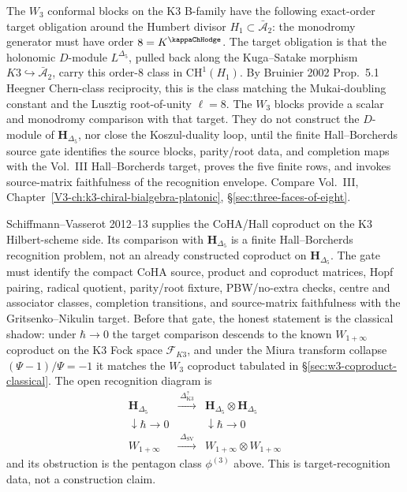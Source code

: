 \begin{remark}
\label{rem:w-algebras-w3-2}
The $W_3$ conformal blocks on the K3 B-family have the following
exact-order target obligation around the Humbert divisor
$H_1\subset\bar{\mathcal A}_2$: the monodromy generator must have
order $8 = K^{\kappaChHodge}$. The target obligation is that the
holonomic $D$-module $L^{\Delta_5}$, pulled back along the
Kuga--Satake morphism $K3\hookrightarrow\bar{\mathcal A}_2$, carry this
order-$8$ class in $\mathrm{CH}^1(H_1)$. By Bruinier 2002 Prop.~5.1
Heegner Chern-class reciprocity, this is the class matching the
Mukai-doubling constant and the Lusztig root-of-unity $\ell = 8$.
The $W_3$ blocks provide a scalar and monodromy comparison with that
target. They do not construct the $D$-module of
$\mathbf H_{\Delta_5}$, nor close the Koszul-duality loop, until the
finite Hall--Borcherds source gate identifies the source blocks,
parity/root data, and completion maps with the Vol.~III
Hall--Borcherds target, proves the five finite rows, and invokes
source-matrix faithfulness of the recognition envelope. Compare
Vol.~III,
Chapter~\ref{V3-ch:k3-chiral-bialgebra-platonic},
\S\ref{sec:three-faces-of-eight}.
\end{remark}

\begin{remark}
\label{rem:w-algebras-w3-3}
Schiffmann--Vasserot 2012--13 supplies the CoHA/Hall coproduct on the
K3 Hilbert-scheme side. Its comparison with
$\mathbf H_{\Delta_5}$ is a finite Hall--Borcherds recognition problem,
not an already constructed coproduct on $\mathbf H_{\Delta_5}$. The gate
must identify the compact CoHA source, product and coproduct matrices,
Hopf pairing, radical quotient, parity/root fixture, PBW/no-extra checks,
centre and associator classes, completion transitions, and source-matrix
faithfulness with the Gritsenko--Nikulin target. Before that gate, the
honest statement is the classical shadow: under
$\hbar\to 0$ the target comparison descends to the known
$W_{1+\infty}$ coproduct on the K3 Fock space $\mathcal F_{K3}$, and
under the Miura transform collapse $(\Psi-1)/\Psi = -1$ it matches the
$W_3$ coproduct tabulated in \S\ref{sec:w3-coproduct-classical}. The
open recognition diagram is
\[
\begin{array}{ccc}
\mathbf H_{\Delta_5} & \xrightarrow{\;\Delta_{\mathrm{K3}}^{?}\;} & \mathbf H_{\Delta_5}\otimes\mathbf H_{\Delta_5} \\
\downarrow{\scriptstyle\hbar\to 0} & & \downarrow{\scriptstyle\hbar\to 0} \\
W_{1+\infty} & \xrightarrow{\;\Delta_{\mathrm{SV}}\;} & W_{1+\infty}\otimes W_{1+\infty}
\end{array}
\]
and its obstruction is the pentagon class $\phi^{(3)}$ above. This is
target-recognition data, not a construction claim.
\end{remark}
